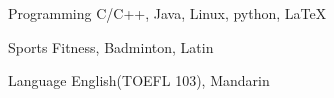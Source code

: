 \vspace{-6.0mm}


\begin{cvskills}


\cvskill
{Programming} %
{C/C++, Java, Linux, python, \LaTeX} %

\cvskill
{Sports} %
{Fitness, Badminton, Latin} %

\cvskill
{Language} %
{English(TOEFL 103), Mandarin} %

\end{cvskills}